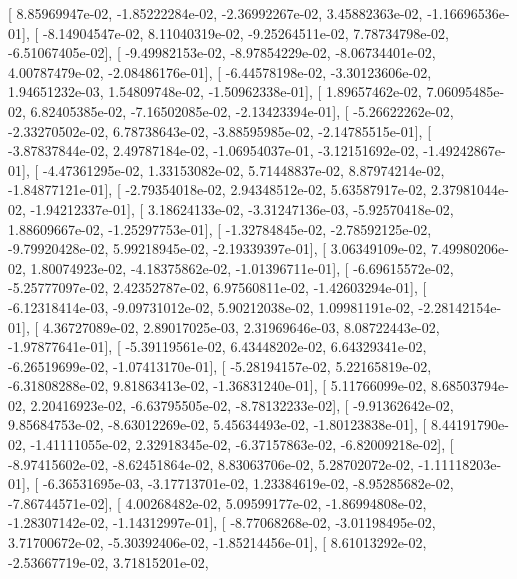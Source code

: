 \documentclass{article}
\begin{document}
       [  8.85969947e-02,  -1.85222284e-02,  -2.36992267e-02,
          3.45882363e-02,  -1.16696536e-01],
       [ -8.14904547e-02,   8.11040319e-02,  -9.25264511e-02,
          7.78734798e-02,  -6.51067405e-02],
       [ -9.49982153e-02,  -8.97854229e-02,  -8.06734401e-02,
          4.00787479e-02,  -2.08486176e-01],
       [ -6.44578198e-02,  -3.30123606e-02,   1.94651232e-03,
          1.54809748e-02,  -1.50962338e-01],
       [  1.89657462e-02,   7.06095485e-02,   6.82405385e-02,
         -7.16502085e-02,  -2.13423394e-01],
       [ -5.26622262e-02,  -2.33270502e-02,   6.78738643e-02,
         -3.88595985e-02,  -2.14785515e-01],
       [ -3.87837844e-02,   2.49787184e-02,  -1.06954037e-01,
         -3.12151692e-02,  -1.49242867e-01],
       [ -4.47361295e-02,   1.33153082e-02,   5.71448837e-02,
          8.87974214e-02,  -1.84877121e-01],
       [ -2.79354018e-02,   2.94348512e-02,   5.63587917e-02,
          2.37981044e-02,  -1.94212337e-01],
       [  3.18624133e-02,  -3.31247136e-03,  -5.92570418e-02,
          1.88609667e-02,  -1.25297753e-01],
       [ -1.32784845e-02,  -2.78592125e-02,  -9.79920428e-02,
          5.99218945e-02,  -2.19339397e-01],
       [  3.06349109e-02,   7.49980206e-02,   1.80074923e-02,
         -4.18375862e-02,  -1.01396711e-01],
       [ -6.69615572e-02,  -5.25777097e-02,   2.42352787e-02,
          6.97560811e-02,  -1.42603294e-01],
       [ -6.12318414e-03,  -9.09731012e-02,   5.90212038e-02,
          1.09981191e-02,  -2.28142154e-01],
       [  4.36727089e-02,   2.89017025e-03,   2.31969646e-03,
          8.08722443e-02,  -1.97877641e-01],
       [ -5.39119561e-02,   6.43448202e-02,   6.64329341e-02,
         -6.26519699e-02,  -1.07413170e-01],
       [ -5.28194157e-02,   5.22165819e-02,  -6.31808288e-02,
          9.81863413e-02,  -1.36831240e-01],
       [  5.11766099e-02,   8.68503794e-02,   2.20416923e-02,
         -6.63795505e-02,  -8.78132233e-02],
       [ -9.91362642e-02,   9.85684753e-02,  -8.63012269e-02,
          5.45634493e-02,  -1.80123838e-01],
       [  8.44191790e-02,  -1.41111055e-02,   2.32918345e-02,
         -6.37157863e-02,  -6.82009218e-02],
       [ -8.97415602e-02,  -8.62451864e-02,   8.83063706e-02,
          5.28702072e-02,  -1.11118203e-01],
       [ -6.36531695e-03,  -3.17713701e-02,   1.23384619e-02,
         -8.95285682e-02,  -7.86744571e-02],
       [  4.00268482e-02,   5.09599177e-02,  -1.86994808e-02,
         -1.28307142e-02,  -1.14312997e-01],
       [ -8.77068268e-02,  -3.01198495e-02,   3.71700672e-02,
         -5.30392406e-02,  -1.85214456e-01],
       [  8.61013292e-02,  -2.53667719e-02,   3.71815201e-02,
\end{document}
